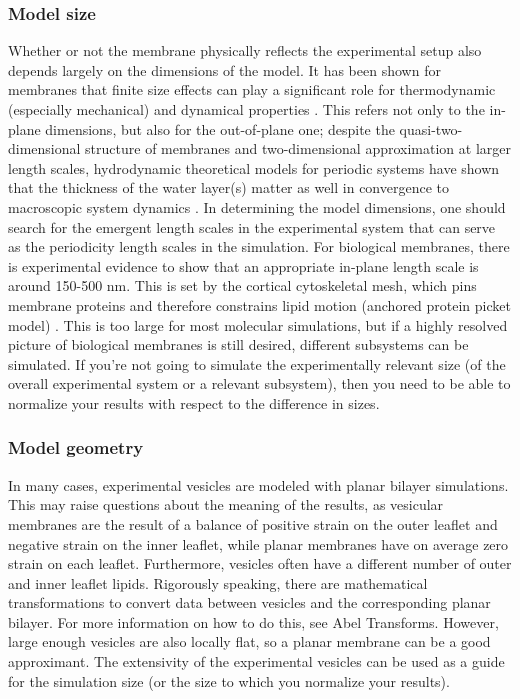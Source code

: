 \documentclass[9pt,bestpractices]{livecoms}
\begin{document}
\subsubsection{Model size}
\label{subsubsec:size}
Whether or not the membrane physically reflects the experimental setup also depends largely on the dimensions of the model.
It has been shown for membranes that finite size effects can play a significant role for thermodynamic (especially mechanical) and dynamical properties \cite{Castro-Roman2006,Waheed2009,Venable2015,Venable2017}.
This refers not only to the in-plane dimensions, but also for the out-of-plane one; despite the quasi-two-dimensional structure of membranes and two-dimensional approximation at larger length scales, hydrodynamic theoretical models for periodic systems have shown that the thickness of the water layer(s) matter as well in convergence to macroscopic system dynamics \cite{Venable2017}.
In determining the model dimensions, one should search for the emergent length scales in the experimental system that can serve as the periodicity length scales in the simulation.
For biological membranes, there is experimental evidence to show that an appropriate in-plane length scale is around 150-500 nm.
This is set by the cortical cytoskeletal mesh, which pins membrane proteins and therefore constrains lipid motion (anchored protein picket model) \cite{Ritchie2003,Morone2006}.
This is too large for most molecular simulations, but if a highly resolved picture of biological membranes is still desired, different subsystems can be simulated.
If you're not going to simulate the experimentally relevant size (of the overall experimental system or a relevant subsystem), then you need to be able to normalize your results with respect to the difference in sizes.

\subsubsection{Model geometry}
\label{subsubsec:geometry}
In many cases, experimental vesicles are modeled with planar bilayer simulations.
This may raise questions about the meaning of the results, as vesicular membranes are the result of a balance of positive strain on the outer leaflet and negative strain on the inner leaflet, while planar membranes have on average zero strain on each leaflet.
Furthermore, vesicles often have a different number of outer and inner leaflet lipids.
Rigorously speaking, there are mathematical transformations to convert data between vesicles and the corresponding planar bilayer.
For more information on how to do this, see Abel Transforms.
However, large enough vesicles are also locally flat, so a planar membrane can be a good approximant.
The extensivity of the experimental vesicles can be used as a guide for the simulation size (or the size to which you normalize your results).
\end{document}
